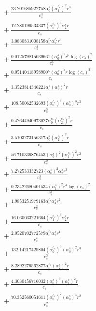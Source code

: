 \documentclass[10pt]{article}
\begin{document}
\begin{align*}
&{}  + \frac{23.201685922758 \alpha_{0}^s \left(\alpha_{1}^{c_s}\right)^{2} r^{3}}{c_{s}^{3}} \\
&{}  + \frac{12.280199534337 \left(\alpha_{0}^{c_s}\right)^{4} \alpha_{2}^s r}{c_{s}} \\
&{}  + \frac{3.0830831008158 \alpha_{0}^{c_s} \alpha_{2}^{c_s} r^{4}}{c_{s}^{4}} \\
&{}  + \frac{0.012579815039661 \left(\alpha_{0}^s\right)^{2} r^{6} \log{\left(c_{s} \right)}^{2}}{c_{s}^{6}} \\
&{}  + \frac{0.051404189589007 \left(\alpha_{0}^s\right)^{7} r \log{\left(c_{s} \right)}^{2}}{c_{s}} \\
&{}  + \frac{3.3523814346221 \alpha_{0}^s \left(\alpha_{2}^s\right)^{2} r}{c_{s}} \\
&{}  + \frac{108.50062532693 \left(\alpha_{0}^{c_s}\right)^{2} \left(\alpha_{0}^s\right)^{3} r^{3}}{c_{s}^{3}} \\
&{}  + \frac{0.42644940973027 \alpha_{0}^{c_s} \left(\alpha_{2}^{c_s}\right)^{2} r}{c_{s}} \\
&{}  + \frac{3.5103273156317 \alpha_{0}^s \left(\alpha_{2}^{c_s}\right)^{2} r}{c_{s}} \\
&{}  + \frac{56.710339876453 \left(\alpha_{0}^s\right)^{2} \left(\alpha_{1}^{c_s}\right)^{2} r^{2}}{c_{s}^{2}} \\
&{}  + \frac{7.272533332723 \left(\alpha_{0}^s\right)^{2} \alpha_{2}^s r^{3}}{c_{s}^{3}} \\
&{}  + \frac{0.23422680401534 \left(\alpha_{1}^s\right)^{2} r^{4} \log{\left(c_{s} \right)}^{2}}{c_{s}^{4}} \\
&{}  + \frac{1.9853251979163 \alpha_{0}^{c_s} \alpha_{4}^s r^{2}}{c_{s}^{2}} \\
&{}  + \frac{16.060033221664 \left(\alpha_{1}^{c_s}\right)^{2} \alpha_{2}^s r}{c_{s}} \\
&{}  + \frac{2.0520702772579 \alpha_{0}^{c_s} \alpha_{2}^s r^{4}}{c_{s}^{4}} \\
&{}  + \frac{132.14217429804 \left(\alpha_{0}^{c_s}\right)^{3} \left(\alpha_{0}^s\right)^{2} r^{3}}{c_{s}^{3}} \\
&{}  + \frac{8.2892279562877 \alpha_{0}^{c_s} \left(\alpha_{2}^s\right)^{2} r}{c_{s}} \\
&{}  + \frac{4.3030456716032 \left(\alpha_{0}^s\right)^{3} \left(\alpha_{1}^s\right)^{2} r}{c_{s}} \\
&{}  + \frac{70.352560051611 \left(\alpha_{0}^{c_s}\right)^{2} \left(\alpha_{0}^s\right)^{4} r^{2}}{c_{s}^{2}} \\

\end{align*}
\end{document}
